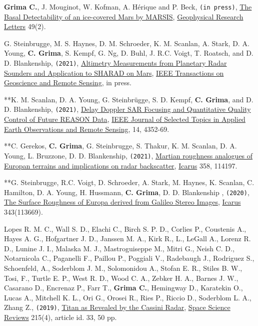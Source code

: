 \begin{etaremune}
\def\labelenumi{\arabic{enumi}.}

\item
  \textbf{Grima C.}, J. Mouginot, W. Kofman, A. Hérique and P. Beck, \texttt{(in press)}, \href{https://doi.org/10.1029/2021GL096518}{The Basal Detectability of an ice-covered Mars by MARSIS}, \ul{Geophysical Research Letters} 49(2).
\item
  G. Steinbrugge, M. S. Haynes, D. M. Schroeder, K. M. Scanlan, A. Stark, D. A. Young, \textbf{C. Grima}, S. Kempf, G. Ng, D. Buhl, J. R.C. Voigt, T. Roatsch, and D. D. Blankenship, \texttt{(2021)}, \href{https://doi.org/10.1109/TGRS.2021.3134638}{Altimetry Measurements from Planetary Radar Sounders and Application to SHARAD on Mars}, \ul{IEEE Transactions on Geoscience and Remote Sensing}, in press.
\item
  **K. M. Scanlan, D. A. Young, G. Steinbrügge, S. D. Kempf, \textbf{C. Grima}, and D. D. Blankenship, \texttt{(2021)}, \href{https://ieeexplore.ieee.org/document/9399772?source=authoralert}{Delay Doppler SAR Focusing and Quantitative Quality Control of Future REASON Data}, \ul{IEEE Journal of Selected Topics in Applied Earth Observations and Remote Sensing}, 14, 4352-69.
\item
  **C. Gerekos, \textbf{C. Grima}, G. Steinbrugge, S. Thakur, K. M. Scanlan, D. A. Young, L. Bruzzone, D. D. Blankenship, \texttt{(2021)}, \href{https://doi.org/10.1016/j.icarus.2020.114197}{Martian roughness analogues of Europan terrains and implications on radar backscatter}, \ul{Icarus} 358, 114197.
\item
  **G. Steinbrugge, R.C. Voigt, D. Schroeder, A. Stark, M. Haynes, K. Scanlan, C. Hamilton, D. A. Young, H. Hussmann, \textbf{C. Grima}, D. D. Blankenship , \texttt{(2020)}, \href{https://www.sciencedirect.com/science/article/abs/pii/S0019103519301526}{The Surface Roughness of Europa derived from Galileo Stereo Images}, \ul{Icarus} 343(113669).
\item
  Lopes R. M. C., Wall S. D., Elachi C., Birch S. P. D., Corlies P., Coustenis A., Hayes A. G., Hofgartner J. D., Janssen M. A., Kirk R., L., LeGall A., Lorenz R. D., Lunine J. I., Malaska M. J., Mastroguiseppe M., Mitri G., Neish C. D., Notarnicola C., Paganelli F., Paillou P., Poggiali V., Radebaugh J., Rodriguez S., Schoenfeld, A., Soderblom J. M., Solomonidou A., Stofan E. R., Stiles B. W., Tosi, F., Turtle E. P., West R. D., Wood C. A., Zebker H. A., Barnes J. W., Casarano D., Encrenaz P., Farr T., \textbf{Grima C.}, Hemingway D., Karatekin O., Lucas A., Mitchell K. L., Ori G., Orosei R., Ries P., Riccio D., Soderblom L. A., Zhang Z., \texttt{(2019)}, \href{https://ui.adsabs.harvard.edu/abs/2019SSRv..215...33L/abstract}{Titan as Revealed by the Cassini Radar}, \ul{Space Science Reviews} 215(4), article id. 33, 50 pp.

\end{etaremune}
